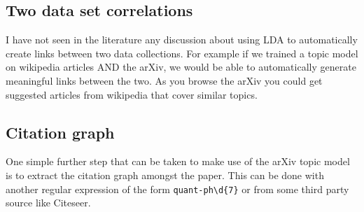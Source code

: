 \documentclass[letterpaper,12pt]{article}
\begin{document}

		


    \subsection{Two data set correlations}

        I have not seen in the literature any discussion about using LDA to automatically
        create links between two data collections.
        For example if we trained a topic model on wikipedia articles AND the arXiv,
        we would be able to automatically generate meaningful links between the two.
        As you browse the arXiv you could get suggested articles from wikipedia that cover similar topics.


			
    \subsection{Citation graph}

        One simple further step that can be taken to make use of the arXiv topic model 
        is to extract the citation graph amongst the paper. This can be done with another
        regular expression of the form \verb|quant-ph\d{7}| or from some third party
        source like Citeseer.
        
\end{document}
